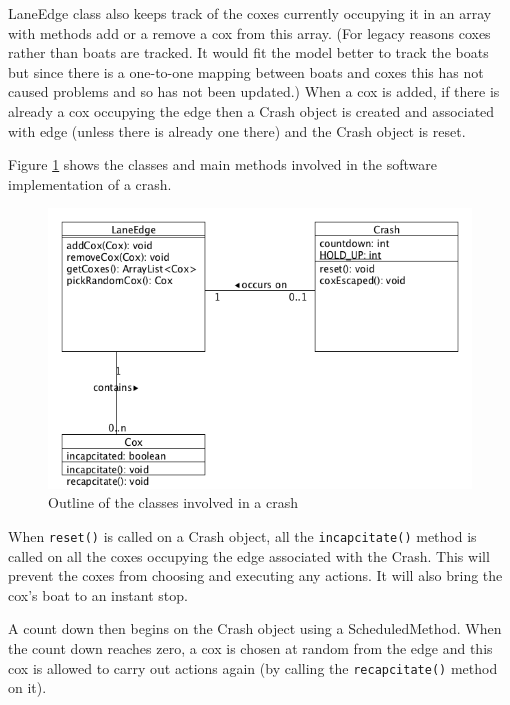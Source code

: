 LaneEdge class also keeps track of the coxes currently occupying it
in an array with methods add or a remove a cox from this array. (For
legacy reasons coxes rather than boats are tracked. It would fit the
model better to track the boats but since there is a one-to-one
mapping between boats and coxes this has not caused problems and so
has not been updated.) When a
cox is added, if there is already a cox occupying the edge then a
Crash object is created and associated with edge (unless there is
already one there) and the Crash object is reset.

Figure \ref{software:fig:crashingUML} shows the classes and main methods involved in the software implementation of a crash.

\begin{figure}
\begin{center}
  \includegraphics[scale=0.3]{images/crashing.png}
  \caption{Outline of the classes involved in a crash}
  \label{software:fig:crashingUML}
\end{center}
\end{figure}


When \texttt{reset()} is called on a Crash object, all the
\texttt{incapcitate()} method is called on all the coxes
occupying the edge associated with the Crash. This will prevent the
coxes from choosing and executing any actions. It will also bring the
cox's boat to an instant stop.

A count down then begins on the Crash object using a
ScheduledMethod. When the count down reaches zero, a cox is chosen at
random from the edge and this cox is allowed to carry out actions
again (by calling the \texttt{recapcitate()} method on it).

